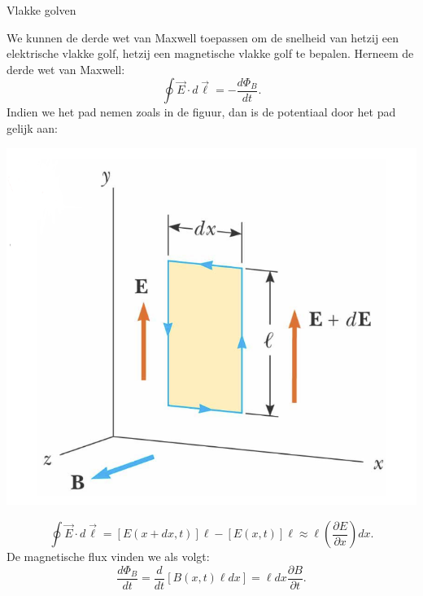 \begin{app}{Vlakke golven}
    \vspace{-0.2cm}
    \begin{minipage}{.7\textwidth}
        We kunnen de derde wet van Maxwell toepassen om de snelheid van hetzij een elektrische vlakke golf, hetzij een magnetische vlakke golf te bepalen. Herneem de derde wet van Maxwell:
        \begin{equation}
            \oint \Vec{E} \cdot d\Vec{\ell} = -\frac{d\Phi_B}{dt}.
        \end{equation}
        Indien we het pad nemen zoals in de figuur, dan is de potentiaal door het pad gelijk aan:
    \end{minipage}
    \begin{minipage}{.26\textwidth  }
        \vspace{-0.1cm}\hspace{0.3cm}\includegraphics[scale = 0.17]{Images/Magnetisme/GeslotenPadVlakkeGolf.png}
    \end{minipage}
    \begin{equation}
        \oint \Vec{E} \cdot d\Vec{\ell} = \left[E(x+ dx, t)\right]\ell - \left[E(x,t)\right]\ell \approx \ell\left(\frac{\partial E}{\partial x}\right)dx.
    \end{equation}
    De magnetische flux vinden we als volgt:
    \begin{equation}
        \frac{d\Phi_B}{dt} = \frac{d}{dt}\left[B(x,t)\ell dx\right] = \ell dx\frac{\partial B}{\partial t}.    

\end{equation}
\end{app}
